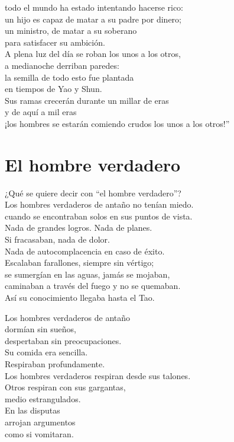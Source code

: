 \documentclass[book,b5paper,hidelinks,final]{memoir}
\begin{document}
	todo el mundo ha estado intentando hacerse rico:\\
	un hijo es capaz de matar a su padre por dinero;\\
	un ministro, de matar a su soberano\\
	para satisfacer su ambición.\\
	A plena luz del día se roban los unos a los otros,\\
	a medianoche derriban paredes:\\
	la semilla de todo esto fue plantada\\
	en tiempos de Yao y Shun.\\
	Sus ramas crecerán durante un millar de eras\\
	y de aquí a mil eras\\
	¡los hombres se estarán comiendo crudos los unos a los otros!''
	
	\chapter*{El hombre verdadero}
	
	¿Qué se quiere decir con ``el hombre verdadero''?\\
	Los hombres verdaderos de antaño no tenían miedo.\\
	cuando se encontraban solos en sus puntos de vista.\\
	Nada de grandes logros. Nada de planes.\\
	Si fracasaban, nada de dolor.\\
	Nada de autocomplacencia en caso de éxito.\\
	Escalaban farallones, siempre sin vértigo;\\
	se sumergían en las aguas, jamás se mojaban,\\
	caminaban a través del fuego y no se quemaban.\\
	Así su conocimiento llegaba hasta el Tao.
	
	Los hombres verdaderos de antaño\\
	dormían sin sueños,\\
	despertaban sin preocupaciones.\\
	Su comida era sencilla.\\
	Respiraban profundamente.\\
	Los hombres verdaderos respiran desde sus talones.\\
	Otros respiran con sus gargantas,\\
	medio estrangulados.\\
	En las disputas\\
	arrojan argumentos\\
	como si vomitaran.
	
\end{document}
